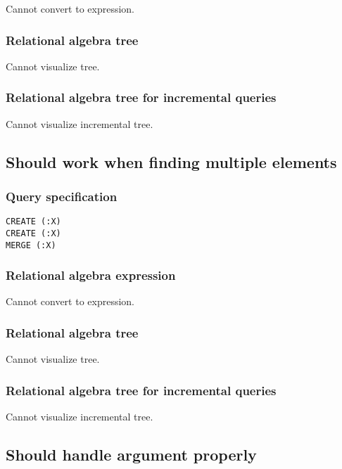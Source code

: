 Cannot convert to expression.

\subsubsection*{Relational algebra tree}

Cannot visualize tree.

\subsubsection*{Relational algebra tree for incremental queries}

Cannot visualize incremental tree.

\subsection{Should work when finding multiple elements}

\subsubsection*{Query specification}

\begin{lstlisting}
CREATE (:X)
CREATE (:X)
MERGE (:X)
\end{lstlisting}

\subsubsection*{Relational algebra expression}

Cannot convert to expression.

\subsubsection*{Relational algebra tree}

Cannot visualize tree.

\subsubsection*{Relational algebra tree for incremental queries}

Cannot visualize incremental tree.

\subsection{Should handle argument properly}

